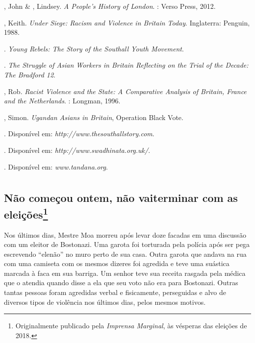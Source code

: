 \begin{bibliohedra}
, John \& , Lindsey. \emph{A People's History of London}. : Verso Press, 2012.

, Keith. \emph{Under Siege: Racism and Violence in Britain Today}. Inglaterra: Penguin, 1988.

. \emph{Young Rebels: The Story of the Southall Youth Movement}.

. \emph{The Struggle of Asian Workers in Britain Reflecting on the Trial of the Decade: The Bradford 12}.

, Rob. \emph{Racist Violence and the State: A Comparative Analysis of Britain, France and the Netherlands}. : Longman, 1996.

, Simon. \emph{Ugandan Asians in Britain}, Operation Black Vote.

. Disponível em: \emph{http://www.thesouthallstory.com}.

. Disponível em: \emph{http://www.swadhinata.org.uk/}.

. Disponível em:  \emph{www.tandana.org}.
\end{bibliohedra}


\part{}

\chapter[Não começou ontem, não vai terminar com as eleições]{Não começou ontem, não vai\break terminar com as eleições\footnote[*]{Originalmente publicado pela \emph{Imprensa Marginal}, às vésperas das eleições de 2018.}}



Nos últimos dias, Mestre Moa morreu após levar doze facadas em uma discussão com um eleitor de Bostonazi. Uma garota foi torturada pela polícia após ser pega escrevendo ``elenão'' no muro perto de sua casa. Outra garota que andava na rua com uma camiseta com os mesmos dizeres foi agredida e teve uma suástica marcada à faca em sua barriga. Um senhor teve sua receita rasgada pela médica que o atendia quando disse a ela que seu voto não era para Bostonazi. Outras tantas pessoas foram agredidas verbal e fisicamente, perseguidas e alvo de diversos tipos de violência nos últimos dias, pelos mesmos motivos.


